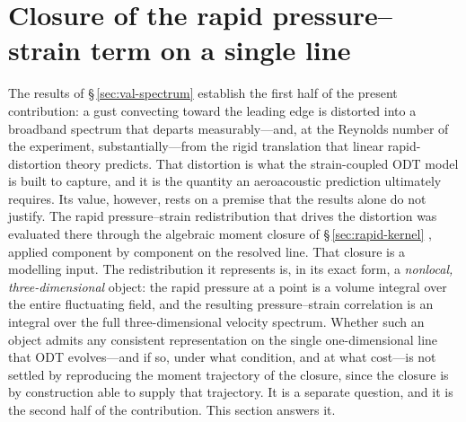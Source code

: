 \documentclass[lineno]{JFM-FLM_Au}
\begin{document}

\section{Closure of the rapid pressure--strain term on a single line}
\label{sec:gate}

The results of \S\,\ref{sec:val-spectrum} establish the first half of the
present contribution: a gust convecting toward the leading edge is distorted
into a broadband spectrum that departs measurably---and, at the Reynolds number
of the experiment, substantially---from the rigid translation that linear
rapid-distortion theory predicts. That distortion is what the strain-coupled
ODT model is built to capture, and it is the quantity an aeroacoustic
prediction ultimately requires. Its value, however, rests on a premise that the
results alone do not justify. The rapid pressure--strain redistribution that
drives the distortion was evaluated there through the algebraic moment closure of \S\,\ref{sec:rapid-kernel}
\citep{LaunderReeceRodi1975}, applied component by component on the resolved
line. That closure is a modelling input. The redistribution it represents is,
in its exact form, a \emph{nonlocal, three-dimensional} object: the rapid
pressure at a point is a volume integral over the entire fluctuating field, and
the resulting pressure--strain correlation is an integral over the full
three-dimensional velocity spectrum. Whether such an object admits any
consistent representation on the single one-dimensional line that ODT
evolves---and if so, under what condition, and at what cost---is not settled by
reproducing the moment trajectory of the closure, since the closure is by
construction able to supply that trajectory. It is a separate question, and it
is the second half of the contribution. This section answers it.
\end{document}
